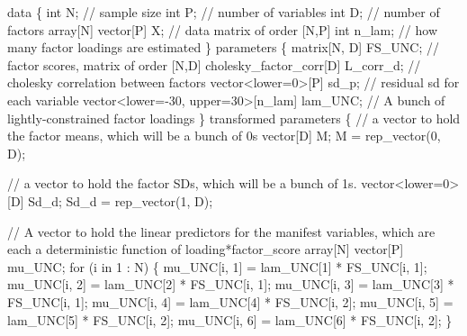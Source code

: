 \documentclass[
  letterpaper,
  DIV=11,
  numbers=noendperiod]{scrreprt}
\newenvironment{Shaded}{\begin{snugshade}}{\end{snugshade}}
\newcommand{\CommentTok}[1]{\textcolor[rgb]{0.37,0.37,0.37}{#1}}
\newcommand{\ControlFlowTok}[1]{\textcolor[rgb]{0.00,0.23,0.31}{#1}}
\newcommand{\DataTypeTok}[1]{\textcolor[rgb]{0.68,0.00,0.00}{#1}}
\newcommand{\DecValTok}[1]{\textcolor[rgb]{0.68,0.00,0.00}{#1}}
\newcommand{\KeywordTok}[1]{\textcolor[rgb]{0.00,0.23,0.31}{#1}}
\newcommand{\NormalTok}[1]{\textcolor[rgb]{0.00,0.23,0.31}{#1}}
\begin{document}
\begin{Shaded}
\begin{Highlighting}[]
\KeywordTok{data}\NormalTok{ \{}
  \DataTypeTok{int}\NormalTok{ N; }\CommentTok{// sample size}
  \DataTypeTok{int}\NormalTok{ P; }\CommentTok{// number of variables}
  \DataTypeTok{int}\NormalTok{ D; }\CommentTok{// number of factors}
  \DataTypeTok{array}\NormalTok{[N] }\DataTypeTok{vector}\NormalTok{[P] X; }\CommentTok{// data matrix of order [N,P]}
  \DataTypeTok{int}\NormalTok{ n\_lam; }\CommentTok{// how many factor loadings are estimated}
\NormalTok{\}}
\KeywordTok{parameters}\NormalTok{ \{}
  \DataTypeTok{matrix}\NormalTok{[N, D] FS\_UNC; }\CommentTok{// factor scores, matrix of order [N,D]}
  \DataTypeTok{cholesky\_factor\_corr}\NormalTok{[D] L\_corr\_d; }\CommentTok{// cholesky correlation between factors}
  \DataTypeTok{vector}\NormalTok{\textless{}}\KeywordTok{lower}\NormalTok{=}\DecValTok{0}\NormalTok{\textgreater{}[P] sd\_p; }\CommentTok{// residual sd for each variable}
  \DataTypeTok{vector}\NormalTok{\textless{}}\KeywordTok{lower}\NormalTok{={-}}\DecValTok{30}\NormalTok{, }\KeywordTok{upper}\NormalTok{=}\DecValTok{30}\NormalTok{\textgreater{}[n\_lam] lam\_UNC; }\CommentTok{// A bunch of lightly{-}constrained factor loadings}
\NormalTok{\}}
\KeywordTok{transformed parameters}\NormalTok{ \{}
  \CommentTok{// a vector to hold the factor means, which will be a bunch of 0s}
  \DataTypeTok{vector}\NormalTok{[D] M;}
\NormalTok{  M = rep\_vector(}\DecValTok{0}\NormalTok{, D);}
  
  \CommentTok{// a vector to hold the factor SDs, which will be a bunch of 1s. }
  \DataTypeTok{vector}\NormalTok{\textless{}}\KeywordTok{lower}\NormalTok{=}\DecValTok{0}\NormalTok{\textgreater{}[D] Sd\_d;}
\NormalTok{  Sd\_d = rep\_vector(}\DecValTok{1}\NormalTok{, D);}
  
  \CommentTok{// A vector to hold the linear predictors for the manifest variables, which are each a deterministic function of loading*factor\_score}
  \DataTypeTok{array}\NormalTok{[N] }\DataTypeTok{vector}\NormalTok{[P] mu\_UNC;}
  \ControlFlowTok{for}\NormalTok{ (i }\ControlFlowTok{in} \DecValTok{1}\NormalTok{ : N) \{}
\NormalTok{    mu\_UNC[i, }\DecValTok{1}\NormalTok{] = lam\_UNC[}\DecValTok{1}\NormalTok{] * FS\_UNC[i, }\DecValTok{1}\NormalTok{];}
\NormalTok{    mu\_UNC[i, }\DecValTok{2}\NormalTok{] = lam\_UNC[}\DecValTok{2}\NormalTok{] * FS\_UNC[i, }\DecValTok{1}\NormalTok{];}
\NormalTok{    mu\_UNC[i, }\DecValTok{3}\NormalTok{] = lam\_UNC[}\DecValTok{3}\NormalTok{] * FS\_UNC[i, }\DecValTok{1}\NormalTok{];}
\NormalTok{    mu\_UNC[i, }\DecValTok{4}\NormalTok{] = lam\_UNC[}\DecValTok{4}\NormalTok{] * FS\_UNC[i, }\DecValTok{2}\NormalTok{];}
\NormalTok{    mu\_UNC[i, }\DecValTok{5}\NormalTok{] = lam\_UNC[}\DecValTok{5}\NormalTok{] * FS\_UNC[i, }\DecValTok{2}\NormalTok{];}
\NormalTok{    mu\_UNC[i, }\DecValTok{6}\NormalTok{] = lam\_UNC[}\DecValTok{6}\NormalTok{] * FS\_UNC[i, }\DecValTok{2}\NormalTok{];}
\NormalTok{  \}}
  

\end{Highlighting}
\end{Shaded}
\end{document}
